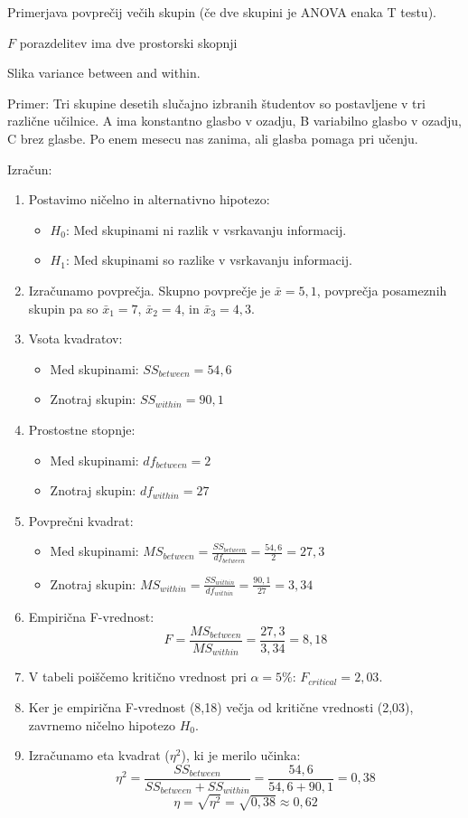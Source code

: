 Primerjava povprečij večih skupin (če dve skupini je ANOVA enaka T testu).

$F$ porazdelitev ima dve prostorski skopnji

Slika variance between and within.

Primer: Tri skupine desetih slučajno izbranih študentov so postavljene v tri različne učilnice. A ima konstantno glasbo v ozadju, B variabilno glasbo v ozadju, C brez glasbe. Po enem mesecu nas zanima, ali glasba pomaga pri učenju.

Izračun:
\begin{enumerate}
    \item Postavimo ničelno in alternativno hipotezo:
        \begin{itemize}
            \item $H_0$: Med skupinami ni razlik v vsrkavanju informacij.
            \item $H_1$: Med skupinami so razlike v vsrkavanju informacij.
        \end{itemize}
    \item Izračunamo povprečja. Skupno povprečje je $\bar{x} = 5,1$, povprečja posameznih skupin pa so $\bar{x}_1 = 7$, $\bar{x}_2 = 4$, in $\bar{x}_3 = 4,3$.
    \item Vsota kvadratov:
        \begin{itemize}
            \item Med skupinami: $SS_{between} = 54,6$
            \item Znotraj skupin: $SS_{within} = 90,1$
        \end{itemize}
    \item Prostostne stopnje:
        \begin{itemize}
            \item Med skupinami: $df_{between} = 2$
            \item Znotraj skupin: $df_{within} = 27$
        \end{itemize}
    \item Povprečni kvadrat:
        \begin{itemize}
            \item Med skupinami: $MS_{between} = \frac{SS_{between}}{df_{between}} = \frac{54,6}{2} = 27,3$
            \item Znotraj skupin: $MS_{within} = \frac{SS_{within}}{df_{within}} = \frac{90,1}{27} = 3,34$
        \end{itemize}
    \item Empirična F-vrednost: 
        \[F = \frac{MS_{between}}{MS_{within}} = \frac{27,3}{3,34} = 8,18\]
    \item V tabeli poiščemo kritično vrednost pri $\alpha = 5\%$: $F_{critical} = 2,03$.
    \item Ker je empirična F-vrednost (8,18) večja od kritične vrednosti (2,03), zavrnemo ničelno hipotezo $H_0$.
    \item Izračunamo eta kvadrat ($\eta^2$), ki je merilo učinka:
        \[\eta^2 = \frac{SS_{between}}{SS_{between} + SS_{within}} = \frac{54,6}{54,6 + 90,1} = 0,38\]
        \[ \eta = \sqrt{\eta^2} = \sqrt{0,38} \approx 0,62\]
\end{enumerate}

